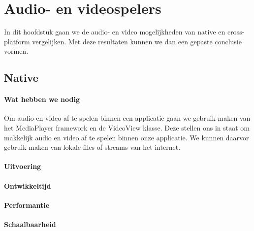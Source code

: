 
\chapter{Audio- en videospelers}%
\label{ch:audioenvideo}

In dit hoofdstuk gaan we de audio- en video mogelijkheden van native en cross-platform vergelijken. 
Met deze resultaten kunnen we dan een gepaste conclusie vormen.

\section{Native}
\subsubsection{Wat hebben we nodig}
Om audio en video af te spelen binnen een applicatie gaan we gebruik maken van het MediaPlayer 
framework en de VideoView klasse. Deze stellen ons in staat om makkelijk audio en video af te spelen binnen 
onze applicatie. We kunnen daarvor gebruik maken van lokale files of streams van het internet.

\subsubsection{Uitvoering}



\subsubsection{Ontwikkeltijd}



\subsubsection{Performantie}



\subsubsection{Schaalbaarheid}




